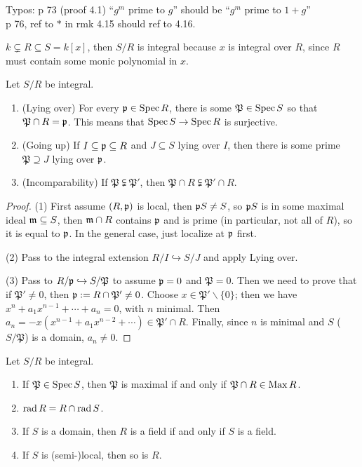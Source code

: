  \setcounter{lecture}{24}

 Typos: p 73 (proof 4.1) ``$g^m$ prime to $g$'' should be ``$g^m$ prime to $1+g$''\\
 p 76, ref to $\ast$ in rmk 4.15 should ref to 4.16.

 \begin{example}
   $k\subsetneq R\subseteq S=k[x]$, then $S/R$ is integral because $x$ is integral over
   $R$, since $R$ must contain some monic polynomial in $x$.
 \end{example}
 \begin{theorem}[Going Up]
   Let $S/R$ be integral.
   \begin{enumerate}
     \item (Lying over) For every $\mathfrak{p}\in \operatorname{Spec} R$, there is some $\mathfrak{P}\in \operatorname{Spec}
     S$ so that $\mathfrak{P}\cap R=\mathfrak{p}$. This means that $\operatorname{Spec} S\to \operatorname{Spec} R$ is
     surjective.

     \item (Going up) If $I\subseteq \mathfrak{p}\subseteq R$ and $J\subseteq S$ lying over $I$,
     then there is some prime $\mathfrak{P}\supseteq J$ lying over $\mathfrak{p}$.

     \item (Incomparability) If $\mathfrak{P}\subsetneqq \mathfrak{P}'$, then $\mathfrak{P}\cap R\subsetneqq
     \mathfrak{P}'\cap R$.
   \end{enumerate}
 \end{theorem}
 \begin{proof}
   (1) First assume $(R,\mathfrak{p})$ is local, then $\mathfrak{p} S\neq S$, so $\mathfrak{p} S$ is in some maximal
   ideal $\mathfrak{m}\subseteq S$, then $\mathfrak{m}\cap R$ contains $\mathfrak{p}$ and is prime (in particular, not
   all of $R$), so it is equal to $\mathfrak{p}$. In the general case, just localize at $\mathfrak{p}$ first.

   (2) Pass to the integral extension $R/I\hookrightarrow S/J$ and apply Lying over.

   (3) Pass to $R/\mathfrak{p}\hookrightarrow S/\mathfrak{P}$ to assume $\mathfrak{p}=0$ and $\mathfrak{P}=0$.
   Then we need to prove that if $\mathfrak{P}'\neq 0$, then $\mathfrak{p}:=R\cap \mathfrak{P}'\neq
   0$. Choose $x\in \mathfrak{P}'\smallsetminus \{0\}$; then we have
   $x^n+a_1x^{n-1}+\cdots + a_n=0$, with $n$ minimal. Then
   $a_n=-x(x^{n-1}+a_1x^{n-2}+\cdots )\in \mathfrak{P}'\cap R$. Finally, since $n$ is
   minimal and $S$ ($S/\mathfrak{P}$) is a domain, $a_n\neq 0$.
 \end{proof}
 \begin{corollary}
   Let $S/R$ be integral.
   \begin{enumerate}
     \item If $\mathfrak{P}\in \operatorname{Spec} S$, then $\mathfrak{P}$ is maximal if and only if
     $\mathfrak{P}\cap R\in \operatorname{Max} R$.

     \item $\operatorname{rad} R = R\cap \operatorname{rad} S $.

     \item If $S$ is a domain, then $R$ is a field if and only if $S$ is a field.

     \item If $S$ is (semi-)local, then so is $R$.
   \end{enumerate}
 \end{corollary}

